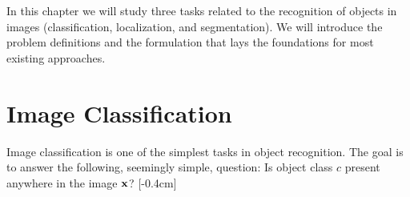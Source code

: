 In this chapter we will study three tasks related to the recognition of objects in images (classification, localization, and segmentation). We will introduce the problem definitions and the formulation that lays the foundations for most existing approaches.










\section{Image Classification}
\label{sec:image_classification}


Image classification is one of the simplest tasks in object recognition. The goal is to answer the following, seemingly simple, question: Is object class $c$ present anywhere in the image ${\bf x}$?
[-0.4cm]

